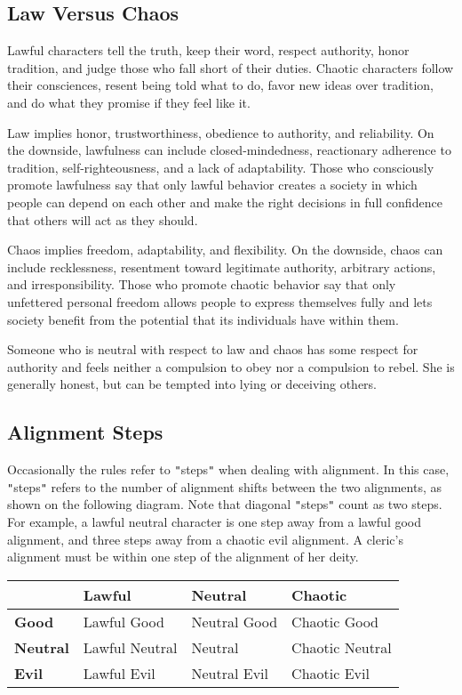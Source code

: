 \subsection{Law Versus Chaos}

				
Lawful characters tell the truth, keep their word, respect authority, honor tradition, and judge those who fall short of their duties. Chaotic characters follow their consciences, resent being told what to do, favor new ideas over tradition, and do what they promise if they feel like it.
				
Law implies honor, trustworthiness, obedience to authority, and reliability. On the downside, lawfulness can include closed-mindedness, reactionary adherence to tradition, self-righteousness, and a lack of adaptability. Those who consciously promote lawfulness say that only lawful behavior creates a society in which people can depend on each other and make the right decisions in full confidence that others will act as they should.
				
Chaos implies freedom, adaptability, and flexibility. On the downside, chaos can include recklessness, resentment toward legitimate authority, arbitrary actions, and irresponsibility. Those who promote chaotic behavior say that only unfettered personal freedom allows people to express themselves fully and lets society benefit from the potential that its individuals have within them.
				
Someone who is neutral with respect to law and chaos has some respect for authority and feels neither a compulsion to obey nor a compulsion to rebel. She is generally honest, but can be tempted into lying or deceiving others.
				
\subsection{Alignment Steps}

				
Occasionally the rules refer to \texttt{{}"{}}steps\texttt{{}"{}} when dealing with alignment. 
In this case, \texttt{{}"{}}steps\texttt{{}"{}} refers to the number of alignment shifts between 
the two alignments, as shown on the following diagram. Note that diagonal \texttt{{}"{}}steps\texttt{{}"{}}
count as two steps. For example, a lawful neutral character is one step away from a lawful good alignment, 
and three steps away from a chaotic evil alignment. A cleric's alignment must be within one step of the 
alignment of her deity. 

\begin{tabular}{l|l|l|l}
 & \textbf{Lawful} & \textbf{Neutral} & \textbf{Chaotic}\\
 \hline
\textbf{Good} & Lawful Good & Neutral Good & Chaotic Good \\
\hline
\textbf{Neutral} & Lawful Neutral & Neutral & Chaotic Neutral \\
\hline
\textbf{Evil} & Lawful Evil & Neutral Evil & Chaotic Evil \\
\hline
\end{tabular}
														
